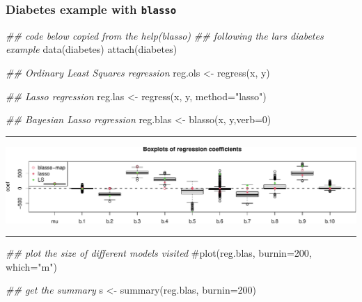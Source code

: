 \documentclass[
  letterpaper,
  DIV=11,
  numbers=noendperiod]{scrartcl}
\newenvironment{Shaded}{\begin{snugshade}}{\end{snugshade}}
\newcommand{\AttributeTok}[1]{\textcolor[rgb]{0.40,0.45,0.13}{#1}}
\newcommand{\CommentTok}[1]{\textcolor[rgb]{0.37,0.37,0.37}{#1}}
\newcommand{\DecValTok}[1]{\textcolor[rgb]{0.68,0.00,0.00}{#1}}
\newcommand{\DocumentationTok}[1]{\textcolor[rgb]{0.37,0.37,0.37}{\textit{#1}}}
\newcommand{\FunctionTok}[1]{\textcolor[rgb]{0.28,0.35,0.67}{#1}}
\newcommand{\NormalTok}[1]{\textcolor[rgb]{0.00,0.23,0.31}{#1}}
\newcommand{\OtherTok}[1]{\textcolor[rgb]{0.00,0.23,0.31}{#1}}
\newcommand{\StringTok}[1]{\textcolor[rgb]{0.13,0.47,0.30}{#1}}
\begin{document}
\hypertarget{diabetes-example-with-blasso}{%
\subsubsection{\texorpdfstring{Diabetes example with
\texttt{blasso}}{Diabetes example with blasso}}\label{diabetes-example-with-blasso}}

\begin{Shaded}
\begin{Highlighting}[]
\DocumentationTok{\#\# code below copied from the help(blasso)}
\DocumentationTok{\#\# following the lars diabetes example}
\FunctionTok{data}\NormalTok{(diabetes)}
\FunctionTok{attach}\NormalTok{(diabetes)}

\DocumentationTok{\#\# Ordinary Least Squares regression}
\NormalTok{reg.ols }\OtherTok{\textless{}{-}} \FunctionTok{regress}\NormalTok{(x, y)}

\DocumentationTok{\#\# Lasso regression}
\NormalTok{reg.las }\OtherTok{\textless{}{-}} \FunctionTok{regress}\NormalTok{(x, y, }\AttributeTok{method=}\StringTok{"lasso"}\NormalTok{)}

\DocumentationTok{\#\# Bayesian Lasso regression}
\NormalTok{reg.blas }\OtherTok{\textless{}{-}} \FunctionTok{blasso}\NormalTok{(x, y,}\AttributeTok{verb=}\DecValTok{0}\NormalTok{)}
\end{Highlighting}
\end{Shaded}

\begin{center}\rule{0.5\linewidth}{0.5pt}\end{center}

\includegraphics{W6_files/figure-pdf/unnamed-chunk-12-1.pdf}

\begin{center}\rule{0.5\linewidth}{0.5pt}\end{center}

\begin{Shaded}
\begin{Highlighting}[]
\DocumentationTok{\#\# plot the size of different models visited}
\CommentTok{\#plot(reg.blas, burnin=200, which="m")}

\DocumentationTok{\#\# get the summary}
\NormalTok{s }\OtherTok{\textless{}{-}} \FunctionTok{summary}\NormalTok{(reg.blas, }\AttributeTok{burnin=}\DecValTok{200}\NormalTok{)}
\end{Highlighting}
\end{Shaded}
\end{document}
